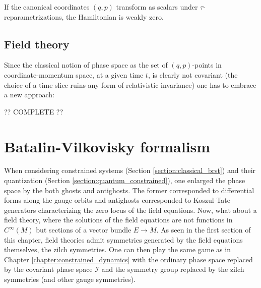     \begin{property}
        If the canonical coordinates $(q,p)$ transform as scalars under $\tau$-reparametrizations, the Hamiltonian is weakly zero.
    \end{property}

\subsection{Field theory}

    Since the classical notion of phase space as the set of $(q,p)$-points in coordinate-momentum space, at a given time $t$, is clearly not covariant (the choice of a time slice ruins any form of relativistic invariance) one has to embrace a new approach:

    ?? COMPLETE ??

\section{Batalin-Vilkovisky formalism}

    When considering constrained systems (Section \ref{section:classical_brst}) and their quantization (Section \ref{section:quantum_constrained}), one enlarged the phase space by the both ghosts and antighosts. The former corresponded to differential forms along the gauge orbits and antighosts corresponded to Koszul-Tate generators characterizing the zero locus of the field equations. Now, what about a field theory, where the solutions of the field equations are not functions in $C^\infty(M)$ but sections of a vector bundle $E\rightarrow M$. As seen in the first section of this chapter, field theories admit symmetries generated by the field equations themselves, the zilch symmetries. One can then play the same game as in Chapter \ref{chapter:constrained_dynamics} with the ordinary phase space replaced by the covariant phase space $\mathcal{I}$ and the symmetry group replaced by the zilch symmetries (and other gauge symmetries).

